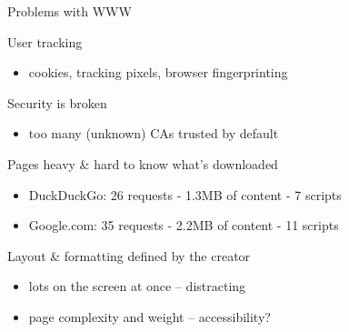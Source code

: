 \documentclass[presentation, 11pt,  aspectratio=169]{beamer}
\begin{document}
\begin{frame}[label={sec:org75d15ba}]{Problems with WWW}
\begin{block}{User tracking}
\begin{itemize}
\item cookies, tracking pixels, browser fingerprinting\\
\end{itemize}
\end{block}

\begin{block}{Security is broken}
\begin{itemize}
\item too many (unknown) CAs trusted by default\\
\end{itemize}
\pause
\end{block}
\begin{block}{Pages heavy \& hard to know what's downloaded}
\begin{itemize}
\item DuckDuckGo: 26 requests - 1.3MB of content - 7 scripts\\
\item Google.com: 35 requests - 2.2MB of content - 11 scripts\\
\end{itemize}

\pause
\end{block}
\begin{block}{Layout \& formatting defined by the creator}
\begin{itemize}
\item lots on the screen at once -- distracting\\
\item page complexity and weight -- accessibility?\\
\end{itemize}
\end{block}
\end{frame}
\end{document}
